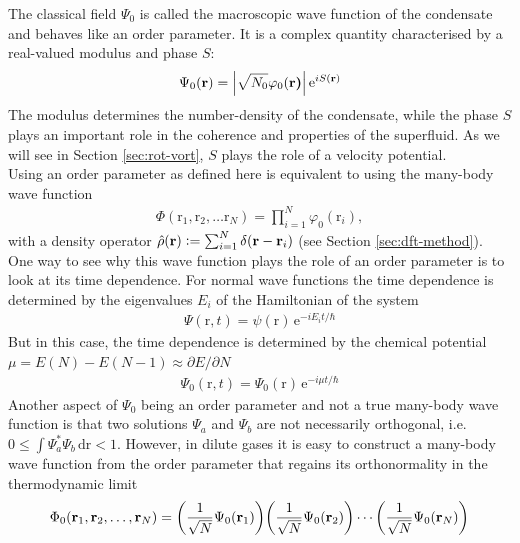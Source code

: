\documentclass[12pt,a4paper]{book}
\renewcommand{\vec}[1]{\bm{\mathrm{#1}}}
\newcommand{\unit}[1]{\,\mathrm{#1}}
\begin{document}
			The classical field $\Psi_0$ is called the macroscopic wave function of the condensate and behaves like an order parameter. It is a complex quantity characterised by a real-valued modulus and phase $S$:
			\begin{align}
				\Psi_0(\vec{r}) = \absolutevalue{\sqrt{N_0}\varphi_0(\vec{r)}}\,\mathrm{e}^{iS(\vec{r})}\label{eq:order-param-complex}
			\end{align}
			The modulus determines the number-density of the condensate, while the phase $S$ plays an important role in the coherence and properties of the superfluid. As we will see in Section \ref{sec:rot-vort}, $S$ plays the role of a velocity potential.\\
			
			Using an order parameter as defined here is equivalent to using the many-body wave function
			\begin{align}
				\Phi(\vec{r}_1,\vec{r}_2,\ldots\vec{r}_N)=\prod_{i=1}^{N}\varphi_0(\vec{r}_i),
			\end{align}
			with a density operator $\hat{\rho}(\vec{r}) \vcentcolon= \sum_{i=1}^{N}\delta(\vec{r}-\vec{r}_i)$ (see Section \ref{sec:dft-method}). One way to see why this wave function plays the role of an order parameter is to look at its time dependence. For normal wave functions the time dependence is determined by the eigenvalues $E_i$ of the Hamiltonian of the system
			\begin{align}
				\Psi(\vec{r},t)=\psi(\vec{r})\,\mathrm{e}^{-iE_it/\hbar}
			\end{align}
			But in this case, the time dependence is determined by the chemical potential $\mu=E(N)-E(N-1)\approx \partial E/\partial N$
			\begin{align}
				\Psi_0(\vec{r},t)=\Psi_0(\vec{r})\,\mathrm{e}^{-i\mu t/\hbar} \label{eq:td-order-param}
			\end{align}
			Another aspect of $\Psi_0$ being an order parameter and not a true many-body wave function is that two solutions $\Psi_a$ and $\Psi_b$ are not necessarily orthogonal, i.e. $0 \leq \int\!\Psi_a^*\Psi_b\unit{d}\vec{r} < 1$. However, in dilute gases it is easy to construct a many-body wave function from the order parameter that regains its orthonormality in the thermodynamic limit
			\begin{align}
				\Phi_0(\vec{r}_1,\vec{r}_2,\ldots,\vec{r}_N) = \qty(\frac{1}{\sqrt{N}}\Psi_0(\vec{r}_1))\qty(\frac{1}{\sqrt{N}}\Psi_0(\vec{r}_2))\cdots\qty(\frac{1}{\sqrt{N}}\Psi_0(\vec{r}_N))
			\end{align}
			
\end{document}
